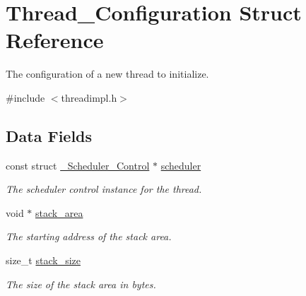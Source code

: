 \hypertarget{structThread__Configuration}{}\section{Thread\+\_\+\+Configuration Struct Reference}
\label{structThread__Configuration}


The configuration of a new thread to initialize.  




{\ttfamily \#include $<$threadimpl.\+h$>$}

\subsection*{Data Fields}
\begin{DoxyCompactItemize}
\item 
\mbox{\label{structThread__Configuration_a3bca5a8ceff33aa59d62c233cc23a371}} 
const struct \mbox{\hyperlink{struct__Scheduler__Control}{\+\_\+\+Scheduler\+\_\+\+Control}} $\ast$ \mbox{\hyperlink{structThread__Configuration_a3bca5a8ceff33aa59d62c233cc23a371}{scheduler}}
\begin{DoxyCompactList}\small\item\em The scheduler control instance for the thread. \end{DoxyCompactList}\item 
\mbox{\label{structThread__Configuration_a6224f3fee408de5e5695d3637a3c52df}} 
void $\ast$ \mbox{\hyperlink{structThread__Configuration_a6224f3fee408de5e5695d3637a3c52df}{stack\+\_\+area}}
\begin{DoxyCompactList}\small\item\em The starting address of the stack area. \end{DoxyCompactList}\item 
\mbox{\label{structThread__Configuration_a89843071eddfe209710935e883e4f7c6}} 
size\+\_\+t \mbox{\hyperlink{structThread__Configuration_a89843071eddfe209710935e883e4f7c6}{stack\+\_\+size}}
\begin{DoxyCompactList}\small\item\em The size of the stack area in bytes. \end{DoxyCompactList}\item 
\mbox{\label{structThread__Configuration_a99abd507251abbc1b51303641440fdd2}} 

\end{DoxyCompactItemize}
